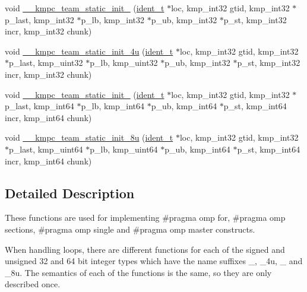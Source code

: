 \begin{DoxyCompactItemize}
\item 
void \hyperlink{group__WORK__SHARING_gac43752941984fb8fda7dc8f2a430f4cb}{\-\_\-\-\_\-kmpc\-\_\-team\-\_\-static\-\_\-init\-\_} (\hyperlink{group__BASIC__TYPES_ga690fda6b92f039a72db263c6b4394ddb}{ident\-\_\-t} $\ast$loc, kmp\-\_\-int32 gtid, kmp\-\_\-int32 $\ast$p\-\_\-last, kmp\-\_\-int32 $\ast$p\-\_\-lb, kmp\-\_\-int32 $\ast$p\-\_\-ub, kmp\-\_\-int32 $\ast$p\-\_\-st, kmp\-\_\-int32 incr, kmp\-\_\-int32 chunk)
\item 
void \hyperlink{group__WORK__SHARING_ga99c820d33a0515e359a8f3414d3e9392}{\-\_\-\-\_\-kmpc\-\_\-team\-\_\-static\-\_\-init\-\_\-4u} (\hyperlink{group__BASIC__TYPES_ga690fda6b92f039a72db263c6b4394ddb}{ident\-\_\-t} $\ast$loc, kmp\-\_\-int32 gtid, kmp\-\_\-int32 $\ast$p\-\_\-last, kmp\-\_\-uint32 $\ast$p\-\_\-lb, kmp\-\_\-uint32 $\ast$p\-\_\-ub, kmp\-\_\-int32 $\ast$p\-\_\-st, kmp\-\_\-int32 incr, kmp\-\_\-int32 chunk)
\item 
void \hyperlink{group__WORK__SHARING_ga5d02abafbc1bf1f9c8d7f3d44ad85970}{\-\_\-\-\_\-kmpc\-\_\-team\-\_\-static\-\_\-init\-\_} (\hyperlink{group__BASIC__TYPES_ga690fda6b92f039a72db263c6b4394ddb}{ident\-\_\-t} $\ast$loc, kmp\-\_\-int32 gtid, kmp\-\_\-int32 $\ast$p\-\_\-last, kmp\-\_\-int64 $\ast$p\-\_\-lb, kmp\-\_\-int64 $\ast$p\-\_\-ub, kmp\-\_\-int64 $\ast$p\-\_\-st, kmp\-\_\-int64 incr, kmp\-\_\-int64 chunk)
\item 
void \hyperlink{group__WORK__SHARING_ga81091e3b6b3dfe02aab5e0a661f65433}{\-\_\-\-\_\-kmpc\-\_\-team\-\_\-static\-\_\-init\-\_\-8u} (\hyperlink{group__BASIC__TYPES_ga690fda6b92f039a72db263c6b4394ddb}{ident\-\_\-t} $\ast$loc, kmp\-\_\-int32 gtid, kmp\-\_\-int32 $\ast$p\-\_\-last, kmp\-\_\-uint64 $\ast$p\-\_\-lb, kmp\-\_\-uint64 $\ast$p\-\_\-ub, kmp\-\_\-int64 $\ast$p\-\_\-st, kmp\-\_\-int64 incr, kmp\-\_\-int64 chunk)
\end{DoxyCompactItemize}


\subsection{Detailed Description}
These functions are used for implementing {\ttfamily \#pragma omp for}, {\ttfamily \#pragma omp sections}, {\ttfamily \#pragma omp single} and {\ttfamily \#pragma omp master} constructs.

When handling loops, there are different functions for each of the signed and unsigned 32 and 64 bit integer types which have the name suffixes {\ttfamily \-\_}, {\ttfamily \-\_\-4u}, {\ttfamily \-\_} and {\ttfamily \-\_\-8u}. The semantics of each of the functions is the same, so they are only described once.

